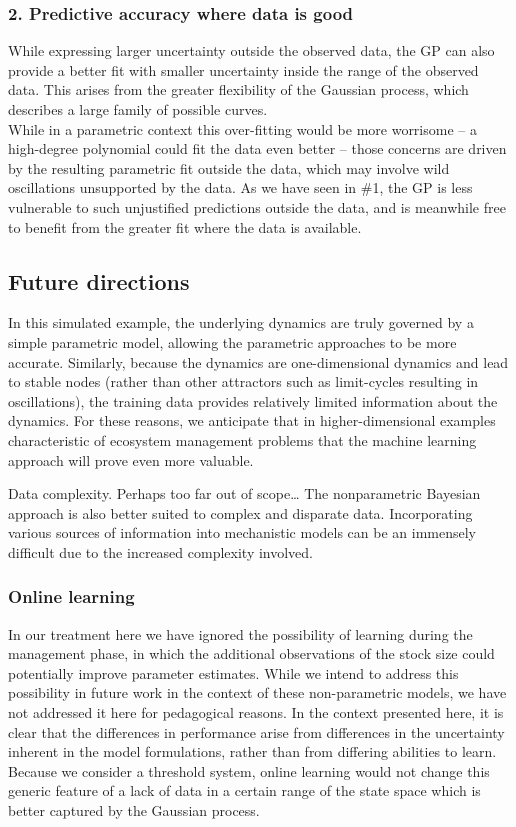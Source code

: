 \documentclass[author-year, review]{elsarticle} %
\begin{document}
\subsubsection{2. Predictive accuracy where data is good}

While expressing larger uncertainty outside the observed data, the GP
can also provide a better fit with smaller uncertainty inside the range
of the observed data. This arises from the greater flexibility of the
Gaussian process, which describes a large family of possible
curves.\\While in a parametric context this over-fitting would be more
worrisome -- a high-degree polynomial could fit the data even better --
those concerns are driven by the resulting parametric fit outside the
data, which may involve wild oscillations unsupported by the data. As we
have seen in \#1, the GP is less vulnerable to such unjustified
predictions outside the data, and is meanwhile free to benefit from the
greater fit where the data is available.

\subsection{Future directions}

In this simulated example, the underlying dynamics are truly governed by
a simple parametric model, allowing the parametric approaches to be more
accurate. Similarly, because the dynamics are one-dimensional dynamics
and lead to stable nodes (rather than other attractors such as
limit-cycles resulting in oscillations), the training data provides
relatively limited information about the dynamics. For these reasons, we
anticipate that in higher-dimensional examples characteristic of
ecosystem management problems that the machine learning approach will
prove even more valuable.

 Data complexity. Perhaps too far out of scope\ldots{} The nonparametric
Bayesian approach is also better suited to complex and disparate data.
Incorporating various sources of information into mechanistic models can
be an immensely difficult due to the increased complexity involved.

\subsubsection{Online learning}

In our treatment here we have ignored the possibility of learning during
the management phase, in which the additional observations of the stock
size could potentially improve parameter estimates. While we intend to
address this possibility in future work in the context of these
non-parametric models, we have not addressed it here for pedagogical
reasons. In the context presented here, it is clear that the differences
in performance arise from differences in the uncertainty inherent in the
model formulations, rather than from differing abilities to learn.
Because we consider a threshold system, online learning would not change
this generic feature of a lack of data in a certain range of the state
space which is better captured by the Gaussian process.
\end{document}
